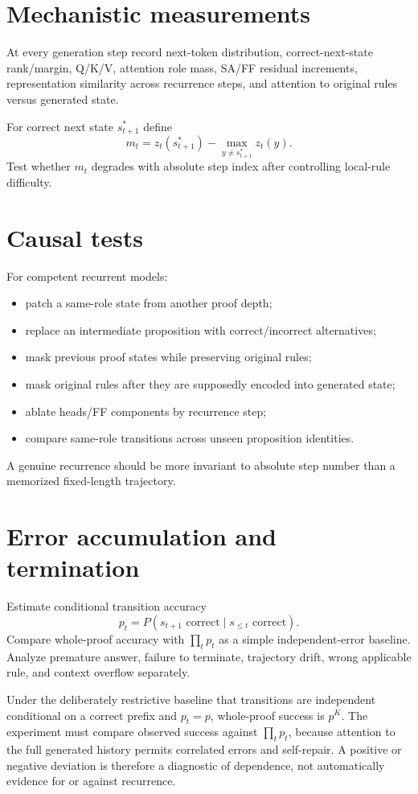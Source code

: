\documentclass[10pt]{article}
\begin{document}
\section{Mechanistic measurements}
At every generation step record next-token distribution, correct-next-state rank/margin, Q/K/V, attention role mass, SA/FF residual increments, representation similarity across recurrence steps, and attention to original rules versus generated state.

For correct next state $s_{t+1}^*$ define
\[
m_t=z_t(s_{t+1}^*)-\max_{y\ne s_{t+1}^*}z_t(y).
\]
Test whether $m_t$ degrades with absolute step index after controlling local-rule difficulty.

\section{Causal tests}
For competent recurrent models:
\begin{itemize}
\item patch a same-role state from another proof depth;
\item replace an intermediate proposition with correct/incorrect alternatives;
\item mask previous proof states while preserving original rules;
\item mask original rules after they are supposedly encoded into generated state;
\item ablate heads/FF components by recurrence step;
\item compare same-role transitions across unseen proposition identities.
\end{itemize}
A genuine recurrence should be more invariant to absolute step number than a memorized fixed-length trajectory.

\section{Error accumulation and termination}
Estimate conditional transition accuracy
\[
p_t=P(s_{t+1}\text{ correct}\mid s_{\le t}\text{ correct}).
\]
Compare whole-proof accuracy with $\prod_t p_t$ as a simple independent-error baseline. Analyze premature answer, failure to terminate, trajectory drift, wrong applicable rule, and context overflow separately.

Under the deliberately restrictive baseline that transitions are independent conditional on a correct prefix and $p_t=p$, whole-proof success is $p^K$. The experiment must compare observed success against $\prod_t p_t$, because attention to the full generated history permits correlated errors and self-repair. A positive or negative deviation is therefore a diagnostic of dependence, not automatically evidence for or against recurrence.
\end{document}
